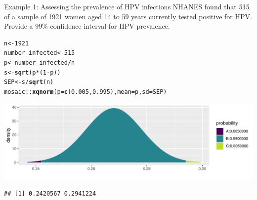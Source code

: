 \documentclass[handout]{beamer}\usepackage[]{graphicx}\usepackage[]{color}
\newcommand{\hlnum}[1]{\textcolor[rgb]{0.686,0.059,0.569}{#1}}%
\newcommand{\hlopt}[1]{\textcolor[rgb]{0,0,0}{#1}}%
\newcommand{\hlstd}[1]{\textcolor[rgb]{0.345,0.345,0.345}{#1}}%
\newcommand{\hlkwb}[1]{\textcolor[rgb]{0.69,0.353,0.396}{#1}}%
\newcommand{\hlkwc}[1]{\textcolor[rgb]{0.333,0.667,0.333}{#1}}%
\newcommand{\hlkwd}[1]{\textcolor[rgb]{0.737,0.353,0.396}{\textbf{#1}}}%
\newenvironment{knitrout}{}{} %
\begin{document}
\begin{frame}[fragile]{Example 1: Assessing the prevalence of HPV infections}
\small
NHANES found that 515 of a sample of 1921 women aged 14 to 59 years currently tested positive for HPV. Provide a 99\% confidence interval for HPV prevalence. 

\begin{knitrout}\scriptsize
{}\color{fgcolor}
\begin{alltt}
\hlstd{n} \hlkwb{<-} \hlnum{1921}
\hlstd{number_infected} \hlkwb{<-} \hlnum{515}
\hlstd{p} \hlkwb{<-} \hlstd{number_infected} \hlopt{/} \hlstd{n}
\hlstd{s} \hlkwb{<-} \hlkwd{sqrt}\hlstd{(p} \hlopt{*} \hlstd{(}\hlnum{1} \hlopt{-} \hlstd{p))}
\hlstd{SEP} \hlkwb{<-} \hlstd{s} \hlopt{/} \hlkwd{sqrt}\hlstd{(n)}
\hlstd{mosaic}\hlopt{::}\hlkwd{xqnorm}\hlstd{(}\hlkwc{p}\hlstd{=}\hlkwd{c}\hlstd{(}\hlnum{0.005}\hlstd{,}\hlnum{0.995}\hlstd{),} \hlkwc{mean} \hlstd{= p,} \hlkwc{sd} \hlstd{= SEP)}
\end{alltt}


{\centering \includegraphics[width=1\linewidth]{figure/unnamed-chunk-12-1} 

}


\begin{verbatim}
## [1] 0.2420567 0.2941224
\end{verbatim}

\end{knitrout}

\end{frame}
\end{document}
